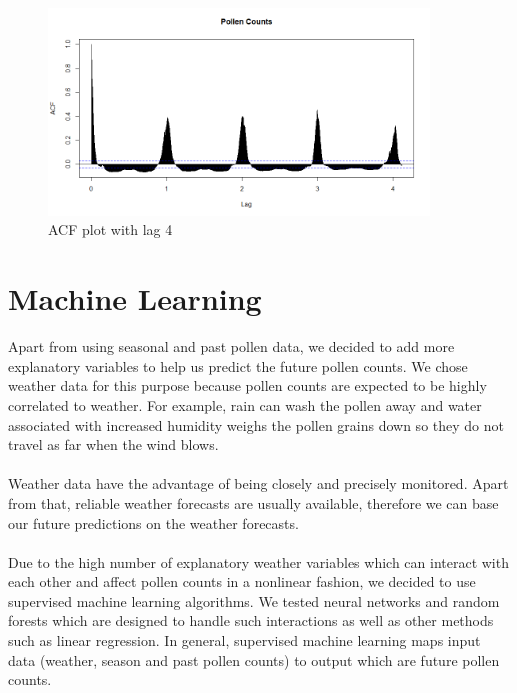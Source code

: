 \documentclass[a4paper,11pt]{article}
\begin{document}
\begin{figure}
	\centering
	\includegraphics[width=0.9\textwidth]{PollenACF1000.png}
	\caption{ACF plot with lag 4}
	\label{fig:ExploratoryACF2}
\end{figure}

\section{Machine Learning}

Apart from using seasonal and past pollen data, we decided to add more explanatory variables to help us predict the future pollen counts. We chose weather data for this purpose because pollen counts are expected to be highly correlated to weather. For example, rain can wash the pollen away and water associated with increased humidity weighs the pollen grains down so they do not travel as far when the wind blows.\\\\
Weather data have the advantage of being closely and precisely monitored. Apart from that, reliable weather forecasts are usually available, therefore we can base our future predictions on the weather forecasts.\\\\
Due to the high number of explanatory weather variables which can interact with each other and affect pollen counts in a nonlinear fashion, we decided to use supervised machine learning algorithms. We tested neural networks and random forests which are designed to handle such interactions as well as other methods such as linear regression. In general, supervised machine learning maps input data (weather, season and past pollen counts) to output which are future pollen counts.
\end{document}
